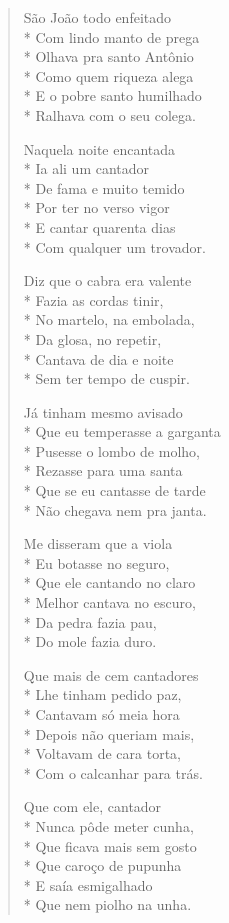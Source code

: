 \begin{verse}
São João todo enfeitado\\*
Com lindo manto de prega\\*
Olhava pra santo Antônio\\*
Como quem riqueza alega\\*
E o pobre santo humilhado\\*
Ralhava com o seu colega.

Naquela noite encantada\\*
Ia ali um cantador\\*
De fama e muito temido\\*
Por ter no verso vigor\\*
E cantar quarenta dias\\*
Com qualquer um trovador.

Diz que o cabra era valente\\*
Fazia as cordas tinir,\\*
No martelo, na embolada,\\*
Da glosa, no repetir,\\*
Cantava de dia e noite\\*
Sem ter tempo de cuspir.

Já tinham mesmo avisado\\*
Que eu temperasse a garganta\\*
Pusesse o lombo de molho,\\*
Rezasse para uma santa\\*
Que se eu cantasse de tarde\\*
Não chegava nem pra janta.

Me disseram que a viola\\*
Eu botasse no seguro,\\*
Que ele cantando no claro\\*
Melhor cantava no escuro,\\*
Da pedra fazia pau,\\*
Do mole fazia duro.

Que mais de cem cantadores\\*
Lhe tinham pedido paz,\\*
Cantavam só meia hora\\*
Depois não queriam mais,\\*
Voltavam de cara torta,\\*
Com o calcanhar para trás.

Que com ele, cantador\\*
Nunca pôde meter cunha,\\*
Que ficava mais sem gosto\\*
Que caroço de pupunha\\*
E saía esmigalhado\\*
Que nem piolho na unha.


\end{verse}
